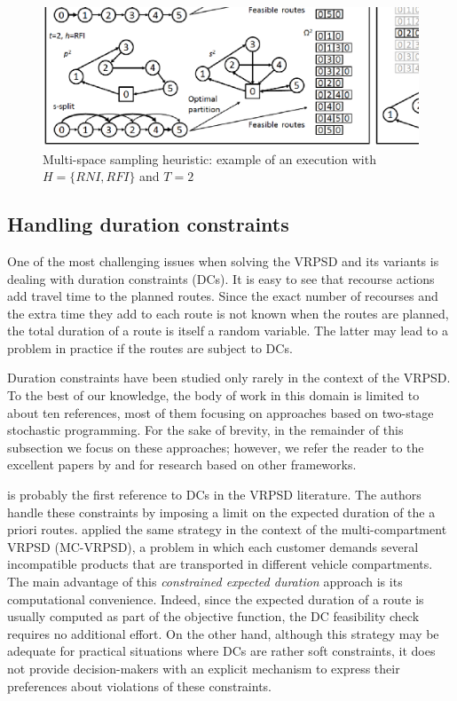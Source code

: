 \begin{figure}
\begin{center}
\includegraphics[width=12cm,clip=true]{./img/msh_example}
\caption{Multi-space sampling heuristic: example of an execution with $H=\{RNI,RFI\}$ and $T=2$}\label{FigExample}
\end{center}
\end{figure}

\subsection{Handling duration constraints}\label{s.vrpsd-dc}
One of the most challenging issues when solving the VRPSD and its variants is dealing with duration constraints (DCs). It is easy to see that recourse actions add travel time to the planned routes. Since the exact number of recourses and the extra time they add to each route is not known when the routes are planned, the total duration of a route is itself a random variable. The latter may lead to a problem in practice if the routes are subject to DCs.

Duration constraints have been studied only rarely in the context of the VRPSD. To the best of our knowledge, the body of work in this domain is limited to about ten references, most of them focusing on approaches based on two-stage stochastic programming. For the sake of brevity, in the remainder of this subsection we focus on these approaches; however, we refer the reader to the excellent papers by \citet{Bent2004,Bent2007} and \citet{Goodson2013,Goodson2013a} for research based on other frameworks.

\citet{Yang2000} is probably the first reference to DCs in the VRPSD literature. The authors handle these constraints by imposing a limit on the expected duration of the a priori routes. \citet{Mendoza2010,Mendoza2011} applied the same strategy in the context of the multi-compartment VRPSD (MC-VRPSD), a problem in which each customer demands several incompatible products that are transported in different vehicle compartments. The main advantage of this \emph{constrained expected duration} approach is its computational convenience. Indeed, since the expected duration of a route is usually computed as part of the objective function, the DC feasibility check requires no additional effort. On the other hand, although this strategy may be adequate for practical situations where DCs are rather soft constraints, it does not provide decision-makers with an explicit mechanism to express their preferences about violations of these constraints.


